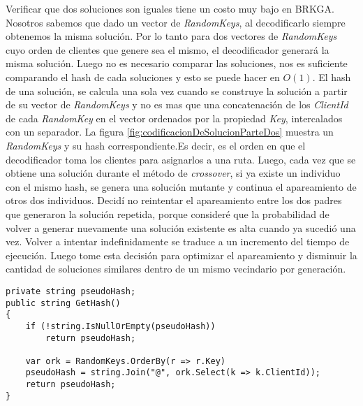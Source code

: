 \bigskip

Verificar que dos soluciones son iguales tiene un costo muy bajo en BRKGA. Nosotros sabemos que dado un vector de \textit{RandomKeys}, al decodificarlo siempre obtenemos la misma solución. Por lo tanto para dos vectores de \textit{RandomKeys} cuyo orden de clientes que genere sea el mismo, el decodificador generará la misma solución. Luego no es necesario comparar las soluciones, nos es suficiente comparando el hash de cada soluciones y esto se puede hacer en $O(1)$. El hash de una solución, se calcula una sola vez cuando se construye la solución a partir de su vector de \textit{RandomKeys} y no es mas que una concatenación de los \textit{ClientId} de cada \textit{RandomKey} en el vector ordenados por la propiedad \textit{Key}, intercalados con un separador. La figura \ref{fig:codificacionDeSolucionParteDos} muestra un \textit{RandomKeys} y su hash correspondiente.Es decir, es el orden en que el decodificador toma los clientes para asignarlos a una ruta. Luego, cada vez que se obtiene una solución durante el método de \textit{crossover}, si ya existe un individuo con el mismo hash, se genera una solución mutante y continua el apareamiento de otros dos individuos. Decidí no reintentar el apareamiento entre los dos padres que generaron la solución repetida, porque consideré que la probabilidad de volver a generar nuevamente una solución existente es alta cuando ya sucedió una vez. Volver a intentar indefinidamente se traduce a un incremento del tiempo de ejecución. Luego tome esta decisión para optimizar el apareamiento y disminuir la cantidad de soluciones similares dentro de un mismo vecindario por generación.

\bigskip

\begin{minipage}{\textwidth}
\begin{lstlisting}
private string pseudoHash;
public string GetHash()
{
	if (!string.IsNullOrEmpty(pseudoHash))
		return pseudoHash;
		
	var ork = RandomKeys.OrderBy(r => r.Key)
	pseudoHash = string.Join("@", ork.Select(k => k.ClientId));
	return pseudoHash;
}
\end{lstlisting}
\end{minipage}

\bigskip

